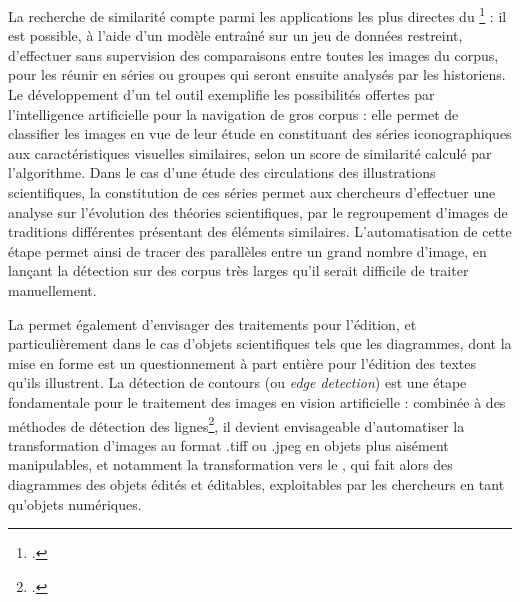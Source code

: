 	La recherche de similarité compte parmi les applications les plus directes du \dl\footcite{moiraghiExplorerCorpusImages2018} : il est possible, à l'aide d'un modèle entraîné sur un jeu de données restreint, d'effectuer sans supervision des comparaisons entre toutes les images du corpus, pour les réunir en séries ou groupes qui seront ensuite analysés par les historiens. Le développement d'un tel outil exemplifie les possibilités offertes par l'intelligence artificielle pour la navigation de gros corpus : elle permet de classifier les images en vue de leur étude en constituant des séries iconographiques aux caractéristiques visuelles similaires, selon un score de similarité calculé par l'algorithme. Dans le cas d'une étude des circulations des illustrations scientifiques, la constitution de ces séries permet aux chercheurs d'effectuer une analyse sur l'évolution des théories scientifiques, par le regroupement d'images de traditions différentes présentant des éléments similaires. L'automatisation de cette étape permet ainsi de tracer des parallèles entre un grand nombre d'image, en lançant la détection sur des corpus très larges qu'il serait difficile de traiter manuellement.
	
	La \cv permet également d'envisager des traitements pour l'édition, et particulièrement dans le cas d'objets scientifiques tels que les diagrammes, dont la mise en forme est un questionnement à part entière pour l'édition des textes qu'ils illustrent. La détection de contours (ou \textit{edge detection}) est une étape fondamentale pour le traitement des images en vision artificielle : combinée à des méthodes de détection des lignes\footcite{linComprehensiveReviewImage2023}, il devient envisageable d'automatiser la transformation d'images au format .tiff ou .jpeg en objets plus aisément manipulables, et notamment la transformation vers le \svg, qui fait alors des diagrammes des objets édités et éditables, exploitables par les chercheurs en tant qu'objets numériques.

